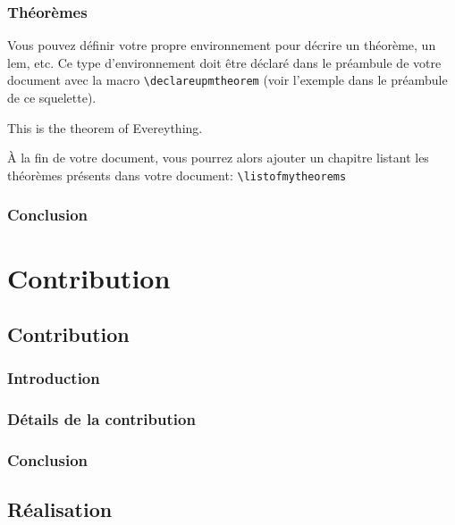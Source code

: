 \documentclass[french]{spimutbmphdthesis}
\begin{document}
\section{Théorèmes}

Vous pouvez définir votre propre environnement pour décrire un théorème, un lem, etc.
Ce type d'environnement doit être déclaré dans le préambule de votre document avec la
macro \texttt{{\textbackslash}declareupmtheorem} (voir l'exemple dans le préambule de
ce squelette).

\begin{mytheorem}
This is the theorem of Evereything.
\end{mytheorem}

\`A la fin de votre document, vous pourrez alors ajouter un chapitre listant les théorèmes présents dans votre document: \texttt{{\textbackslash}listofmytheorems}

\section{Conclusion}
 
 
 
\part{Contribution}

\chapter{Contribution}

\section{Introduction}

\section{Détails de la contribution}

\section{Conclusion}

\chapter{Réalisation}
\end{document}

